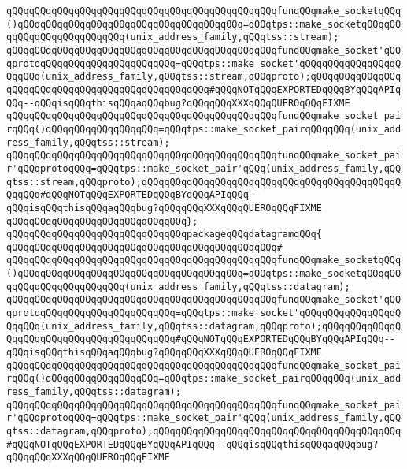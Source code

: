 \verb|qQQqqQQqqQQqqQQqqQQqqQQqqQQqqQQqqQQqqQQqqQQqqQQqfunqQQqmake_socketqQQq()qQQqqQQqqQQqqQQqqQQqqQQqqQQqqQQqqQQqqQQq=qQQqtps::make_socketqQQqqQQqqQQqqQQqqQQqqQQqqQQq(unix_address_family,qQQqtss::stream);|\newline
\verb|qQQqqQQqqQQqqQQqqQQqqQQqqQQqqQQqqQQqqQQqqQQqqQQqfunqQQqmake_socket'qQQqprotoqQQqqQQqqQQqqQQqqQQqqQQq=qQQqtps::make_socket'qQQqqQQqqQQqqQQqqQQqqQQq(unix_address_family,qQQqtss::stream,qQQqproto);qQQqqQQqqQQqqQQqqQQqqQQqqQQqqQQqqQQqqQQqqQQqqQQqqQQq#qQQqNOTqQQqEXPORTEDqQQqBYqQQqAPIqQQq--qQQqisqQQqthisqQQqaqQQqbug?qQQqqQQqXXXqQQqQUEROqQQqFIXME|\newline
\verb|qQQqqQQqqQQqqQQqqQQqqQQqqQQqqQQqqQQqqQQqqQQqqQQqfunqQQqmake_socket_pairqQQq()qQQqqQQqqQQqqQQqqQQq=qQQqtps::make_socket_pairqQQqqQQq(unix_address_family,qQQqtss::stream);|\newline
\verb|qQQqqQQqqQQqqQQqqQQqqQQqqQQqqQQqqQQqqQQqqQQqqQQqfunqQQqmake_socket_pair'qQQqprotoqQQq=qQQqtps::make_socket_pair'qQQq(unix_address_family,qQQqtss::stream,qQQqproto);qQQqqQQqqQQqqQQqqQQqqQQqqQQqqQQqqQQqqQQqqQQqqQQqqQQq#qQQqNOTqQQqEXPORTEDqQQqBYqQQqAPIqQQq--qQQqisqQQqthisqQQqaqQQqbug?qQQqqQQqXXXqQQqQUEROqQQqFIXME|\newline
\verb|qQQqqQQqqQQqqQQqqQQqqQQqqQQqqQQq};|\newline
\newline
\verb|qQQqqQQqqQQqqQQqqQQqqQQqqQQqqQQqpackageqQQqdatagramqQQq{|\newline
\verb|qQQqqQQqqQQqqQQqqQQqqQQqqQQqqQQqqQQqqQQqqQQqqQQq#|\newline
\verb|qQQqqQQqqQQqqQQqqQQqqQQqqQQqqQQqqQQqqQQqqQQqqQQqfunqQQqmake_socketqQQq()qQQqqQQqqQQqqQQqqQQqqQQqqQQqqQQqqQQqqQQq=qQQqtps::make_socketqQQqqQQqqQQqqQQqqQQqqQQqqQQq(unix_address_family,qQQqtss::datagram);|\newline
\verb|qQQqqQQqqQQqqQQqqQQqqQQqqQQqqQQqqQQqqQQqqQQqqQQqfunqQQqmake_socket'qQQqprotoqQQqqQQqqQQqqQQqqQQqqQQq=qQQqtps::make_socket'qQQqqQQqqQQqqQQqqQQqqQQq(unix_address_family,qQQqtss::datagram,qQQqproto);qQQqqQQqqQQqqQQqqQQqqQQqqQQqqQQqqQQqqQQqqQQq#qQQqNOTqQQqEXPORTEDqQQqBYqQQqAPIqQQq--qQQqisqQQqthisqQQqaqQQqbug?qQQqqQQqXXXqQQqQUEROqQQqFIXME|\newline
\verb|qQQqqQQqqQQqqQQqqQQqqQQqqQQqqQQqqQQqqQQqqQQqqQQqfunqQQqmake_socket_pairqQQq()qQQqqQQqqQQqqQQqqQQq=qQQqtps::make_socket_pairqQQqqQQq(unix_address_family,qQQqtss::datagram);|\newline
\verb|qQQqqQQqqQQqqQQqqQQqqQQqqQQqqQQqqQQqqQQqqQQqqQQqfunqQQqmake_socket_pair'qQQqprotoqQQq=qQQqtps::make_socket_pair'qQQq(unix_address_family,qQQqtss::datagram,qQQqproto);qQQqqQQqqQQqqQQqqQQqqQQqqQQqqQQqqQQqqQQqqQQq#qQQqNOTqQQqEXPORTEDqQQqBYqQQqAPIqQQq--qQQqisqQQqthisqQQqaqQQqbug?qQQqqQQqXXXqQQqQUEROqQQqFIXME|\newline
